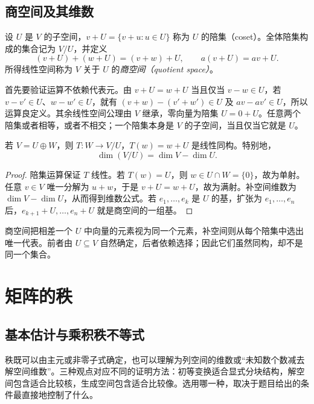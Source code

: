\subsection{商空间及其维数}

\begin{definition}
\label{def:laex-quotient}
设 $U$ 是 $V$ 的子空间，$v+U=\{v+u:u\in U\}$ 称为 $U$ 的陪集（coset）。全体陪集构成的集合记为 $V/U$，并定义
\[
(v+U)+(w+U)=(v+w)+U,\qquad
a(v+U)=av+U.
\]
所得线性空间称为 $V$ 关于 $U$ 的\emph{商空间（quotient space）}。
\end{definition}

首先要验证运算不依赖代表元。由 $v+U=w+U$ 当且仅当 $v-w\in U$，若 $v-v'\in U$、$w-w'\in U$，就有 $(v+w)-(v'+w')\in U$ 及 $av-av'\in U$，所以运算良定义。其余线性空间公理由 $V$ 继承，零向量为陪集 $U=0+U$。任意两个陪集或者相等，或者不相交；一个陪集本身是 $V$ 的子空间，当且仅当它就是 $U$。

\begin{theorem}
\label{thm:laex-quotient-complement}
若 $V=U\oplus W$，则 $T:W\to V/U$，$T(w)=w+U$ 是线性同构。特别地，
\[
\dim(V/U)=\dim V-\dim U.
\]
\end{theorem}

\begin{proof}
陪集运算保证 $T$ 线性。若 $T(w)=U$，则 $w\in U\cap W=\{0\}$，故为单射。任意 $v\in V$ 唯一分解为 $u+w$，于是 $v+U=w+U$，故为满射。补空间维数为 $\dim V-\dim U$，从而得到维数公式。若 $e_1,\ldots,e_k$ 是 $U$ 的基，扩张为 $e_1,\ldots,e_n$ 后，$e_{k+1}+U,\ldots,e_n+U$ 就是商空间的一组基。
\end{proof}

商空间把相差一个 $U$ 中向量的元素视为同一个元素，补空间则从每个陪集中选出唯一代表。前者由 $U\subseteq V$ 自然确定，后者依赖选择；因此它们虽然同构，却不是同一个集合。




\section{矩阵的秩}
\label{sec:laex-matrix-rank}

\subsection{基本估计与乘积秩不等式}

秩既可以由主元或非零子式确定，也可以理解为列空间的维数或“未知数个数减去解空间维数”。三种观点对应不同的证明方法：初等变换适合显式分块结构，解空间包含适合比较核，生成空间包含适合比较像。选用哪一种，取决于题目给出的条件最直接地控制了什么。

